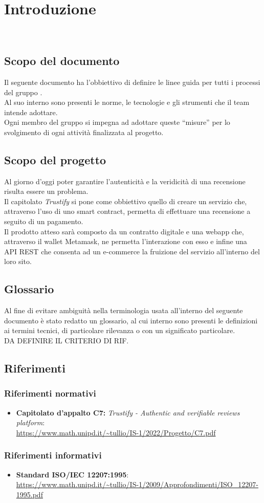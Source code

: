 \section{Introduzione}\
    \subsection{Scopo del documento}
    Il seguente documento ha l’obbiettivo di definire le linee guida per tutti i processi del gruppo \groupName. \\
    Al suo interno sono presenti le norme, le tecnologie e gli strumenti che il team intende adottare. \\
    Ogni membro del gruppo si impegna ad adottare queste “misure” per lo svolgimento di ogni attività finalizzata al progetto.

    \subsection{Scopo del progetto}
    Al giorno d’oggi poter garantire l’autenticità e la veridicità di una recensione risulta essere un problema. \\
    Il capitolato \textit{Trustify} si pone come obbiettivo quello di creare un servizio che, attraverso l’uso di uno smart contract, permetta di effettuare una recensione a seguito di un pagamento. \\
    Il prodotto atteso sarà composto da un contratto digitale e una webapp che, attraverso il wallet Metamask, ne permetta l’interazione con esso e infine una API REST che consenta ad un e-commerce la fruizione del servizio all’interno del loro sito.    

    \subsection{Glossario}
    Al fine di evitare ambiguità nella terminologia usata all’interno del seguente documento è stato redatto un glossario, al cui interno sono presenti le definizioni ai termini tecnici, di particolare rilevanza o con un significato particolare. \\
    DA DEFINIRE IL CRITERIO DI RIF.

    \subsection{Riferimenti}
        \subsubsection{Riferimenti normativi}
            \begin{itemize}
                \item \textbf{Capitolato d'appalto C7:} \textit{Trustify - Authentic and verifiable reviews platform}: \\
                \url{https://www.math.unipd.it/~tullio/IS-1/2022/Progetto/C7.pdf}
            \end{itemize}
        \subsubsection{Riferimenti informativi}
            \begin{itemize}
                \item \textbf{Standard ISO/IEC 12207:1995}: \\
                \url{https://www.math.unipd.it/~tullio/IS-1/2009/Approfondimenti/ISO_12207-1995.pdf}
            \end{itemize}